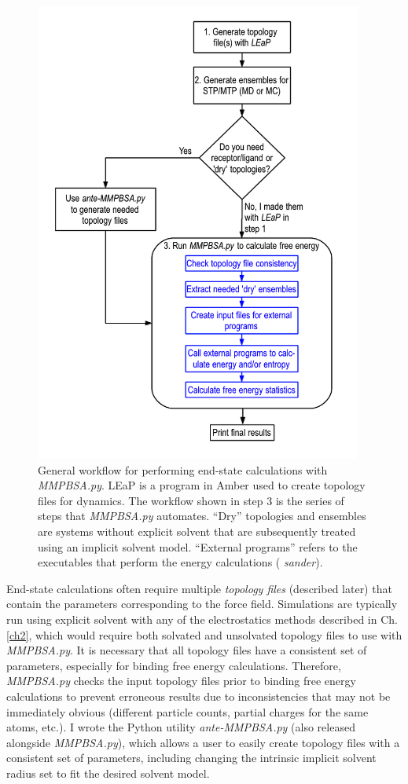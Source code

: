 \begin{figure}
   \includegraphics[height=6in, width=4.24in]{MMPBSA_Workflow.png}
   \caption{General workflow for performing end-state calculations with
            \emph{MMPBSA.py}. LEaP is a program in Amber used to create topology
            files for dynamics. The workflow shown in step 3 is the series of
            steps that \emph{MMPBSA.py} automates. ``Dry'' topologies and
            ensembles are systems without explicit solvent that are subsequently
            treated using an implicit solvent model. ``External programs''
            refers to the executables that perform the energy calculations (\eg
            \emph{sander}).}
   \label{fig6:MMPBSA_Workflow}
\end{figure}

End-state calculations often require multiple \emph{topology files} (described
later) that contain the parameters corresponding to the force field. Simulations
are typically run using explicit solvent with any of the electrostatics methods
described in Ch. \ref{ch2}, which would require both solvated and unsolvated
topology files to use with \emph{MMPBSA.py}. It is necessary that all topology
files have a consistent set of parameters, especially for binding free energy
calculations. Therefore, \emph{MMPBSA.py} checks the input topology files prior
to binding free energy calculations to prevent erroneous results due to
inconsistencies that may not be immediately obvious (\eg different particle
counts, partial charges for the same atoms, etc.). I wrote the Python utility
\emph{ante-MMPBSA.py} (also released alongside \emph{MMPBSA.py}), which allows a
user to easily create topology files with a consistent set of parameters,
including changing the intrinsic implicit solvent radius set to fit the desired
solvent model.

